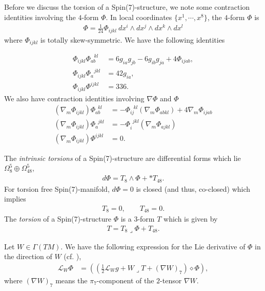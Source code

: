 \documentclass[10pt,a4paper,reqno]{article}
\theoremstyle{definition}
\numberwithin{equation}{section}
\def\del{\nabla}
\def\s7{\Phi}
\def\cL{\mathcal{L}}
\begin{document}
\noindent
Before we discuss the torsion of a Spin(7)-structure, we note some contraction identities involving the $4$-form $\s7$. In local coordinates $\{x^1, \cdots, x^8\}$, the $4$-form $\s7$ is
\begin{align*}
\s7=\frac{1}{24}\s7_{ijkl}\ dx^i\wedge dx^j\wedge dx^k\wedge dx^l    
\end{align*}
where $\s7_{ijkl}$ is totally skew-symmetric. We have the following identities

\begin{align}
\s7_{ijkl}\s7_{ab}^{\, \, \, \, kl}&=6g_{ia}g_{jb}-6g_{ib}g_{ja}+4\s7_{ijab}, \label{eq:impiden2} \\
    \s7_{ijkl}\s7_{a}^{\, \, \, \, jkl}&=42g_{ia}, \label{eq:impiden3} \\
    \s7_{ijkl}\s7^{ijkl}&=336 . \label{eq:impiden4}
\end{align}
We also have contraction identities involving $\del \s7$ and $\s7$
\begin{align}
(\del_m\s7_{ijkl})\s7_{ab}^{\, \, \, kl}&=-\s7_{ij}^{\, \, \, \, kl}(\del_m\s7_{abkl})+4\del_m\s7_{ijab} \label{eq:impiden5}\\
(\del_m\s7_{ijkl})\s7_{a}^{\, \, \, jkl}&=-\s7_{i}^{\, \, \, jkl}(\del_m\s7_{ajkl}) \label{eq:impiden6} \\
(\del_m\s7_{ijkl})\s7^{ijkl}&=0. \label{eq:impiden7}
\end{align}



\medspace

The \emph{intrinsic torsions} of a Spin(7)-structure are differential forms which lie $\Omega^5_8\oplus \Omega^5_{48}$,
\begin{align}\label{eq:intrinsictorsions}
d\Phi = T_8 \wedge \Phi + * T_{48}.
\end{align}
For torsion free Spin(7)-manifold, $d\Phi=0$ is closed (and thus, co-closed) which implies 
\begin{align*}
T_8=0, \qquad T_{48}=0.    
\end{align*}
The \emph{torsion} of a  Spin(7)-structure $\Phi$ is a $3$-form $T$ which is given by
\begin{align}\label{eq:torsion}
T = T_8\lrcorner\s7 + T_{48}.
\end{align}

\medskip

Let $W\in \Gamma(TM)$. We have the following expression for the Lie derivative of $\Phi$ in the direction of $W$ (cf. \cite[eq. (2.39)]{Spin7-flow_Dwivedi}),
\begin{align}
\cL_W\Phi&=\left(\left(\frac 12 \cL_Wg + W\lrcorner T +(\del W)_7 \right)  \diamond \s7 \right), \label{eq:liePhiexp} 
\end{align}
where $(\del W)_7$ means the $\pi_7$-component of the $2$-tensor $\del W$.
\end{document}
